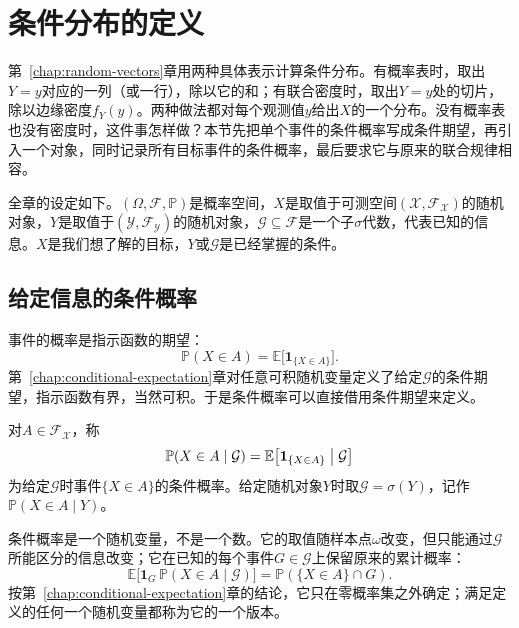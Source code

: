 \section{条件分布的定义}
\label{sec:cdis-definition}

第~\ref{chap:random-vectors}章用两种具体表示计算条件分布。有概率表时，取出$Y=y$对应的一列（或一行），除以它的和；有联合密度时，取出$Y=y$处的切片，除以边缘密度$f_Y(y)$。两种做法都对每个观测值$y$给出$X$的一个分布。没有概率表也没有密度时，这件事怎样做？本节先把单个事件的条件概率写成条件期望，再引入一个对象，同时记录所有目标事件的条件概率，最后要求它与原来的联合规律相容。

全章的设定如下。$(\Omega,\mathcal{F},\mathbb{P})$是概率空间，$X$是取值于可测空间$(\mathcal{X},\mathcal{F}_{\mathcal{X}})$的随机对象，$Y$是取值于$(\mathcal{Y},\mathcal{F}_{\mathcal{Y}})$的随机对象，$\mathcal{G}\subseteq\mathcal{F}$是一个子$\sigma$代数，代表已知的信息。$X$是我们想了解的目标，$Y$或$\mathcal{G}$是已经掌握的条件。

\subsection{给定信息的条件概率}
\label{sec:cdis-conditional-probability}

事件的概率是指示函数的期望：
\[
 \mathbb{P}(X\in A)=\mathbb{E}\bigl[\mathbf{1}_{\{X\in A\}}\bigr].
\]
第~\ref{chap:conditional-expectation}章对任意可积随机变量定义了给定$\mathcal{G}$的条件期望，指示函数有界，当然可积。于是条件概率可以直接借用条件期望来定义。

\begin{definition}[给定信息的条件概率]
\label{def:cdis-conditional-probability}
对$A\in\mathcal{F}_{\mathcal{X}}$，称
\begin{equation}
 \mathbb{P}(X\in A\mid\mathcal{G})=\mathbb{E}\bigl[\mathbf{1}_{\{X\in A\}}\bigm|\mathcal{G}\bigr]
 \label{eq:cdis-conditional-probability}
\end{equation}
为给定$\mathcal{G}$时事件$\{X\in A\}$的条件概率。给定随机对象$Y$时取$\mathcal{G}=\sigma(Y)$，记作$\mathbb{P}(X\in A\mid Y)$。
\end{definition}

条件概率是一个随机变量，不是一个数。它的取值随样本点$\omega$改变，但只能通过$\mathcal{G}$所能区分的信息改变；它在已知的每个事件$G\in\mathcal{G}$上保留原来的累计概率：
\[
 \mathbb{E}\bigl[\mathbf{1}_{G}\,\mathbb{P}(X\in A\mid\mathcal{G})\bigr]=\mathbb{P}(\{X\in A\}\cap G).
\]
按第~\ref{chap:conditional-expectation}章的结论，它只在零概率集之外确定；满足定义的任何一个随机变量都称为它的一个版本。

